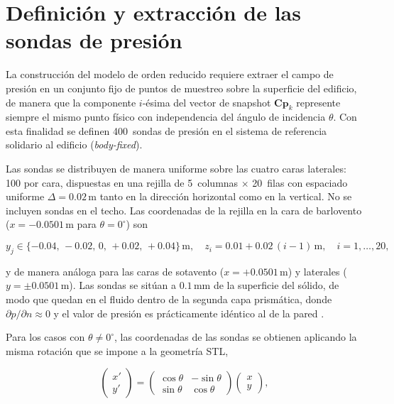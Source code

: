 \section{Definición y extracción de las sondas de presión}
\label{sec:probes}

La construcción del modelo de orden reducido requiere extraer el campo de presión en un conjunto fijo de puntos de muestreo sobre la superficie del edificio, de manera que la componente $i$-ésima del vector de snapshot $\mathbf{Cp}_k$ represente siempre el mismo punto físico con independencia del ángulo de incidencia $\theta$. Con esta finalidad se definen 400~sondas de presión en el sistema de referencia solidario al edificio (\textit{body-fixed}).

Las sondas se distribuyen de manera uniforme sobre las cuatro caras laterales: 100 por cara, dispuestas en una rejilla de 5~columnas $\times$ 20~filas con espaciado uniforme $\Delta = 0.02$\,m tanto en la dirección horizontal como en la vertical. No se incluyen sondas en el techo. Las coordenadas de la rejilla en la cara de barlovento ($x = -0.0501$\,m para $\theta = 0^\circ$) son

\begin{equation}
    y_j \in \{-0.04,\,-0.02,\,0,\,+0.02,\,+0.04\}\,\mathrm{m},
    \quad
    z_i = 0.01 + 0.02\,(i-1)\,\mathrm{m}, \quad i = 1,\ldots,20,
    \label{eq:probe_coords}
\end{equation}

y de manera análoga para las caras de sotavento ($x = +0.0501$\,m) y laterales ($y = \pm0.0501$\,m). Las sondas se sitúan a $0.1$\,mm de la superficie del sólido, de modo que quedan en el fluido dentro de la segunda capa prismática, donde $\partial p / \partial n \approx 0$ y el valor de presión es prácticamente idéntico al de la pared \cite{blocken2007}.

Para los casos con $\theta \neq 0^\circ$, las coordenadas de las sondas se obtienen aplicando la misma rotación que se impone a la geometría STL,

\begin{equation}
    \begin{pmatrix} x' \\ y' \end{pmatrix}
    =
    \begin{pmatrix} \cos\theta & -\sin\theta \\ \sin\theta & \cos\theta \end{pmatrix}
    \begin{pmatrix} x \\ y \end{pmatrix},
    \label{eq:probe_rotation}
\end{equation}

